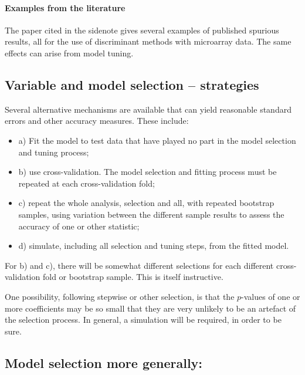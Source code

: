 \documentclass{tufte-book}\usepackage[]{graphicx}\usepackage[]{color}
\newenvironment{itemizz}%
  {\begin{itemize} %
    \setlength{\itemsep}{2pt}%
    \setlength{\parskip}{2pt}} %
  {\end{itemize}}
\begin{document}
\paragraph{Examples from the literature}

The paper cited in the sidenote gives
several examples of published spurious results, all for the use of
discriminant methods with microarray data.  The same effects can arise
from model tuning.

\subsection{Variable and model selection -- strategies}

Several alternative mechanisms are available that can yield reasonable
standard errors and other accuracy measures. These include:
\begin{itemizz}
\item[a)] Fit the model to test data that have played no part in
the model selection and tuning process;
\item[b)] use cross-validation.  The model selection and fitting
process must be repeated at each cross-validation fold;
\item[c)] repeat the whole analysis, selection and all, with repeated
 bootstrap samples, using variation between the different sample
results to assess the accuracy of one or other statistic;
\item[d)] simulate, including all selection and tuning steps, from the
  fitted model.
\end{itemizz}
For b) and c), there will be somewhat different selections for each
different cross-validation fold or bootstrap sample.  This is itself
instructive.

One possibility,
following stepwise or other selection, is that the
$p$-values of one or more coefficients may be so small that they are
very unlikely to be an artefact of the selection process.  In general,
a simulation will be required, in order to be sure.

\subsection*{Model selection more generally:}
\end{document}
